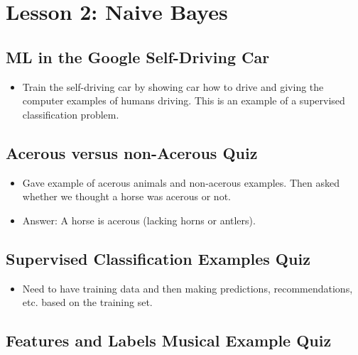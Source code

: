 \documentclass[12pt]{report}
\begin{document}
\section{Lesson 2: Naive Bayes}

\subsection{ML in the Google Self-Driving Car}

\begin{itemize}

\item Train the self-driving car by showing car how to drive and giving the computer examples of humans driving. This is an example of a supervised classification problem.

\end{itemize}

\subsection{Acerous versus non-Acerous Quiz}

\begin{itemize}

\item Gave example of acerous animals and non-acerous examples. Then asked whether we thought a horse was acerous or not. 

\item Answer: A horse is acerous (lacking horns or antlers).  

\end{itemize}

\subsection{Supervised Classification Examples Quiz}

\begin{itemize}

\item Need to have training data and then making predictions, recommendations, etc. based on the training set. 

\end{itemize}

\subsection{Features and Labels Musical Example Quiz}
\end{document}
